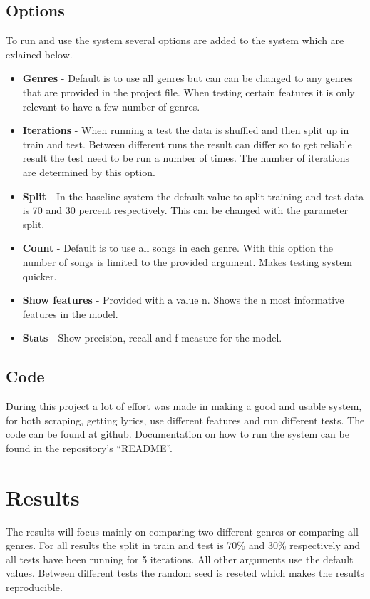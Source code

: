 \documentclass[a4paper, 12pt]{article}
\begin{document}
\subsection{Options}
To run and use the system several options are added to the system which are exlained below.

\begin{itemize}
    \item {\textbf{Genres} - Default is to use all genres but can can be changed to any genres that are provided in the project file.
    When testing certain features it is only relevant to have a few number of genres.}
    \item {\textbf{Iterations} - When running a test the data is shuffled and then split up in train and test.
    Between different runs the result can differ so to get reliable result the test need to be run a number of times.
    The number of iterations are determined by this option.}
    \item {\textbf{Split} - In the baseline system the default value to split training and test data is 70 and 30 percent respectively.
    This can be changed with the parameter split.}
    \item {\textbf{Count} - Default is to use all songs in each genre. With this option the number of songs is limited to the provided argument. Makes testing system quicker.}
    \item {\textbf{Show features} - Provided with a value n. Shows the n most informative features in the model.}
    \item {\textbf{Stats} - Show precision, recall and f-measure for the model.}
\end{itemize}

\subsection{Code}
During this project a lot of effort was made in making a good and usable system, for both scraping, getting lyrics, use different features and run different tests.
The code can be found at github. \cite{github}
Documentation on how to run the system can be found in the repository's ``README''.

\section{Results}
The results will focus mainly on comparing two different genres or comparing all genres.
For all results the split in train and test is 70\% and 30\% respectively and all tests have been running for 5 iterations.
All other arguments use the default values.
Between different tests the random seed is reseted which makes the results reproducible.
\end{document}
